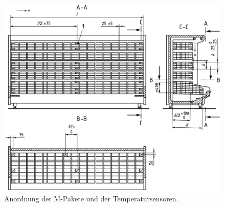 \begin{figure}[h!tb]
\centering
\includegraphics[scale=.12]{Pictures/multi-deck-chilled-cabinet.pdf}
\caption{Anordnung der M-Pakete und der Temperatursensoren.}
\label{fig:Anordnung der M-Pakete}
\end{figure}

